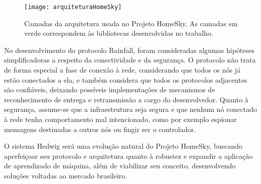 \begin{figure}[H]
	\centering
	\caption{Camadas da arquitetura usada no Projeto HomeSky. As camadas em verde correspondem às bibliotecas desenvolvidas no trabalho.}
  \texttt{[image: arquiteturaHomeSky]}
\label{fig:arquiteturaHomeSky}
\end{figure}

No desenvolvimento do protocolo Rainfall, foram consideradas algumas hipóteses simplificadoras a respeito da conectividade e da segurança. O protocolo não trata de forma especial a fase de conexão à rede, considerando que todos os nós já estão conectados a ela, e também considera que todos os protocolos adjacentes são confiáveis, deixando possíveis implementações de mecanismos de reconhecimento de entrega e retransmissão a cargo do desenvolvedor. Quanto à segurança, assume-se que a infraestrutura seja segura e que nenhum nó conectado à rede tenha comportamento mal intencionado, como por exemplo espionar mensagens destinadas a outros nós ou fingir ser o controlador.

O sistema Hedwig será uma evolução natural do Projeto HomeSky, buscando aperfeiçoar seu protocolo e arquitetura quanto à robustez e expandir a aplicação de aprendizado de máquina, além de viabilizar seu conceito, desenvolvendo soluções voltadas ao mercado brasileiro.
